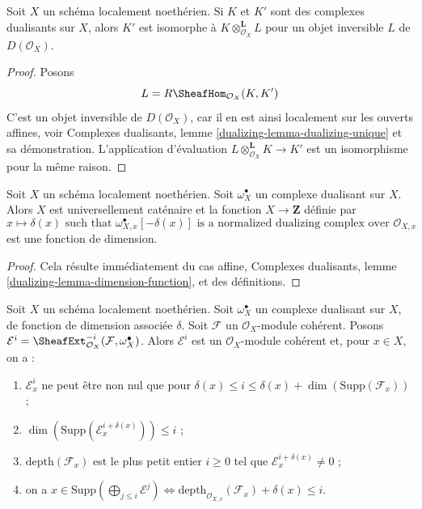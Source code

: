 \begin{lemma}
\label{lemma-dualizing-unique-schemes}
Soit $X$ un schéma localement noethérien. Si $K$ et $K'$ sont des complexes dualisants sur $X$, alors $K'$ est isomorphe à $K \otimes_{\mathcal{O}_X}^\mathbf{L} L$ pour un objet inversible $L$ de $D(\mathcal{O}_X)$.
\end{lemma}

\begin{proof}
Posons
$$
L = R\SheafHom_{\mathcal{O}_X}(K, K')
$$
C'est un objet inversible de $D(\mathcal{O}_X)$, car il en est ainsi localement sur les ouverts affines, voir Complexes dualisants, lemme \ref{dualizing-lemma-dualizing-unique} et sa démonstration. L'application d'évaluation $L \otimes_{\mathcal{O}_X}^\mathbf{L} K \to K'$ est un isomorphisme pour la même raison.
\end{proof}

\begin{lemma}
\label{lemma-dimension-function-scheme}
Soit $X$ un schéma localement noethérien. Soit $\omega_X^\bullet$ un complexe dualisant sur $X$. Alors $X$ est universellement caténaire et la fonction $X \to \mathbf{Z}$ définie par
$$
x \longmapsto \delta(x)\text{ such that }
\omega_{X, x}^\bullet[-\delta(x)]
\text{ is a normalized dualizing complex over }
\mathcal{O}_{X, x}
$$
est une fonction de dimension.
\end{lemma}

\begin{proof}
Cela résulte immédiatement du cas affine, Complexes dualisants, lemme \ref{dualizing-lemma-dimension-function}, et des définitions.
\end{proof}

\begin{lemma}
\label{lemma-sitting-in-degrees}
Soit $X$ un schéma localement noethérien. Soit $\omega_X^\bullet$ un complexe dualisant sur $X$, de fonction de dimension associée $\delta$. Soit $\mathcal{F}$ un $\mathcal{O}_X$-module cohérent. Posons $\mathcal{E}^i = \SheafExt^{-i}_{\mathcal{O}_X}(\mathcal{F}, \omega_X^\bullet)$. Alors $\mathcal{E}^i$ est un $\mathcal{O}_X$-module cohérent et, pour $x \in X$, on a :
\begin{enumerate}
\item $\mathcal{E}^i_x$ ne peut être non nul que pour $\delta(x) \leq i \leq \delta(x) + \dim(\text{Supp}(\mathcal{F}_x))$ ;
\item $\dim(\text{Supp}(\mathcal{E}^{i + \delta(x)}_x)) \leq i$ ;
\item $\text{depth}(\mathcal{F}_x)$ est le plus petit entier $i \geq 0$ tel que $\mathcal{E}_x^{i + \delta(x)} \not = 0$ ;
\item on a $x \in \text{Supp}(\bigoplus_{j \leq i} \mathcal{E}^j)
\Leftrightarrow
\text{depth}_{\mathcal{O}_{X, x}}(\mathcal{F}_x) + \delta(x) \leq i$.
\end{enumerate}
\end{lemma}

